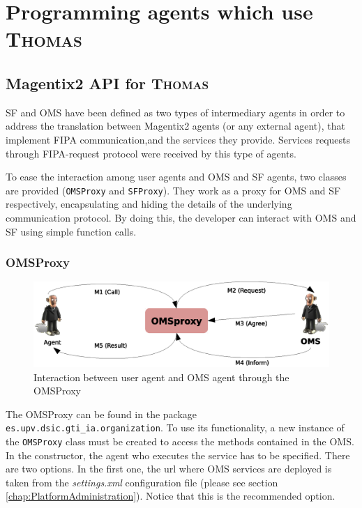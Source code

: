 
\section{Programming agents which use \textsc{Thomas}}\label{sec:programmingAgentsThomas}

\subsection{Magentix2 API for \textsc{Thomas}}\label{thomasAPI}
SF and OMS have been defined as two types of intermediary agents in order to address the translation between Magentix2 agents (or any external agent), that implement FIPA communication,and the services they provide. Services requests through FIPA-request protocol were received by this type of agents.

To ease the interaction among user agents and OMS and SF agents, two classes are provided (\lstinline|OMSProxy| and \lstinline|SFProxy|). They work as a proxy for OMS and SF respectively, encapsulating and hiding the details of the underlying communication protocol. By doing this, the developer can interact with OMS and SF using simple function calls.

\subsubsection{OMSProxy}

\begin{figure}[h!t]
	\centering
	\includegraphics[width=1.0\textwidth]{Thomas/images/oms_omsProxy_interaction}
	\caption{Interaction between user agent and OMS agent through the OMSProxy}
\end{figure}

The OMSProxy can be found in the package \lstinline|es.upv.dsic.gti_ia.organization|. To use its functionality, a new instance of the \lstinline|OMSProxy| class must be created to access the methods contained in the OMS. In the constructor, the agent who executes the service has to be specified. There are two options. In the first one, the url where OMS services are deployed is taken from the \textit{settings.xml} configuration file (please see section \ref{chap:PlatformAdministration}). Notice that this is the recommended option.

